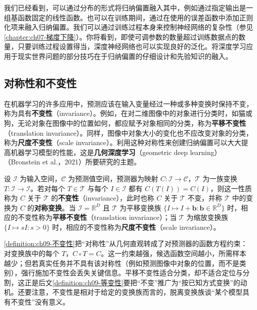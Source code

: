 \documentclass[../../main.tex]{subfiles}
\begin{document}
我们已经看到，可以通过分布的形式将归纳偏置融入其中，例如通过指定输出是一组基函数固定的线性函数。也可以在训练期间，通过在使用的误差函数中添加正则化项来融入归纳偏置。我们可以通过训练过程本身来控制神经网络的复杂性（参见\cref{chapter:ch07-梯度下降}）。你将看到，即使可调参数的数量超过训练数据点的数量，只要训练过程设置得当，深度神经网络也可以实现良好的泛化。将深度学习应用于现实世界问题的部分技巧在于归纳偏置的仔细设计和先验知识的融入。

\subsection{对称性和不变性}\label{subsection:ch09-对称性不变性}

在机器学习的许多应用中，预测应该在输入变量经过一种或多种变换时保持不变，称为具有\textbf{不变性}（invariance）。例如，在对二维图像中的对象进行分类时，如猫或狗，无论对象在图像中的位置如何，都应赋予对象相同的分类，称为\textbf{平移不变性}（translation invariance）。同样，图像中对象大小的变化也不应改变对象的分类，称为\textbf{尺度不变性}（scale invariance）。利用这种对称性来创建归纳偏置可以大大提高机器学习模型的性能，这是\textbf{几何深度学习}（geometric deep learning）（Bronstein et al.，2021）所要研究的主题。

\begin{definition}[不变性与对称性]\label{definition:ch09-不变性}
设 $\mathcal{I}$ 为输入空间，$\mathcal{C}$ 为预测值空间，预测器为映射 $C:\mathcal{I}\to\mathcal{C}$，$\mathcal{T}$ 为一族变换 $T:\mathcal{I}\to\mathcal{I}$。若对每个 $T\in\mathcal{T}$ 与每个 $I\in\mathcal{I}$ 都有 $C(T(I))=C(I)$，则这一性质称为 $C$ 关于 $\mathcal{T}$ 的\textbf{不变性}（invariance），此时也称 $C$ 关于 $\mathcal{T}$ 不变，并称 $\mathcal{T}$ 中的变换为 $C$ 的\textbf{对称变换}。当 $\mathcal{I}=\mathbb{R}^{D}$ 且 $\mathcal{T}$ 为平移变换族 $\{I\mapsto I+\boldsymbol{b}:\boldsymbol{b}\in\mathbb{R}^{D}\}$ 时，相应的不变性称为\textbf{平移不变性}（translation invariance）；当 $\mathcal{T}$ 为缩放变换族 $\{I\mapsto sI:s>0\}$ 时，相应的不变性称为\textbf{尺度不变性}（scale invariance）。
\end{definition}

\begin{remark}\cref{definition:ch09-不变性}把“对称性”从几何直观转成了对预测器的函数方程约束：对变换族中的每个 $T$，$C\circ T=C$。这一约束越强，候选函数空间越小，所需样本越少；但若真实任务并不具有该对称性（例如预测图像中对象的位置，而不是类别），强行施加不变性会丢失关键信息。平移不变性适合分类，却不适合定位与分割，这正是后文\cref{definition:ch09-等变性}要把“不变”推广为“按已知方式变换”的动机。还要注意，不变性是相对于给定的变换族而言的，脱离变换族谈“某个模型具有不变性”没有意义。
\end{remark}
\end{document}
